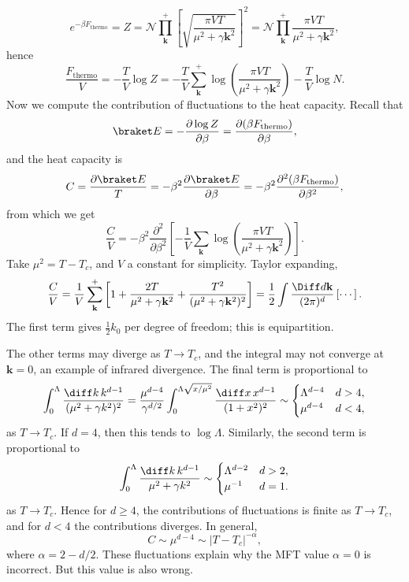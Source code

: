 \documentclass[12pt]{article}
\begin{document}
\[
	e^{-\beta F_{\mathrm{thermo}}} = Z = \mathcal{N}\prod_{\mathbf{k}}^+ \left[ \sqrt{\frac{\pi V T}{\mu^2 + \gamma \mathbf{k}^2}} \right]^2 = \mathcal{N} \prod_{\mathbf{k}}^+ \frac{\pi V T}{\mu^2 + \gamma \mathbf{k}^2},
\]
hence
\[
\frac{F_{\mathrm{thermo}}}{V} = - \frac{T}{V} \log Z = - \frac{T}{V} \sum_{\mathbf{k}}^+ \log \left( \frac{\pi V T}{\mu^2 + \gamma \mathbf{k}^2} \right) - \frac{T}{V} \log N.
\]
Now we compute the contribution of fluctuations to the heat capacity. Recall that
\[
\braket E = - \frac{\partial \log Z}{\partial \beta} = \frac{\partial (\beta F_{\mathrm{thermo}})}{\partial \beta},
\]
and the heat capacity is
\[
C = \frac{\partial \braket E}{T} = - \beta^2 \frac{\partial \braket E}{\partial \beta} = - \beta^2\frac{\partial^2 (\beta F_{\mathrm{thermo}})}{\partial \beta^2},
\]
from which we get
\[
	\frac{C}{V} = - \beta^2 \frac{\partial^2}{\partial \beta^2} \left[ - \frac{1}{V} \sum_{\mathbf{k}} \log \left( \frac{\pi V T}{\mu^2 + \gamma \mathbf{k}^2} \right) \right].
\]
Take $\mu^2 = T - T_c$, and $V$ a constant for simplicity. Taylor expanding,
\[
	\frac{C}{V} = \frac{1}{V} \sum^+_{\mathbf{k}} \left[1 + \frac{2T}{\mu^2 + \gamma \mathbf{k}^2} + \frac{T^2}{(\mu^2 + \gamma \mathbf{k}^2)^2} \right] = \frac{1}{2} \int \frac{\Diff d \mathbf{k}}{(2 \pi)^d} \left[ \cdots \right].
\]
The first term gives $\frac{1}{2} k_0$ per degree of freedom; this is equipartition.

The other terms may diverge as $T \to T_c$, and the integral may not converge at $\mathbf{k} = 0$, an example of infrared divergence. The final term is proportional to
\[
	\int_0^\Lambda \frac{\diff k \, k^{d-1}}{(\mu^2 + \gamma k^2)^2} = \frac{\mu^{d-4}}{\gamma^{d/2}} \int_{0}^{\Lambda \sqrt{x/\mu^2}} \frac{\diff x\, x^{d-1}}{(1 + x^2)^2} \sim
	\begin{cases}
		\Lambda^{d-4} & d > 4, \\
		\mu^{d-4} & d < 4,
	\end{cases}	
\]
as $T \to T_c$. If $d = 4$, then this tends to $\log \Lambda$. Similarly, the second term is proportional to
\[
\int_0^\Lambda \frac{\diff k \, k^{d-1}}{\mu^2 + \gamma k^2} \sim
\begin{cases}
	\Lambda^{d-2} & d > 2, \\
	\mu^{-1} & d = 1.
\end{cases}
\]
as $T \to T_c$. Hence for $d \geq 4$, the contributions of fluctuations is finite as $T \to T_c$, and for $d < 4$ the contributions diverges. In general,
\[
C \sim \mu^{d-4} \sim |T - T_c|^{-\alpha},
\]
where $\alpha = 2 - d/2$. These fluctuations explain why the MFT value $\alpha = 0$ is incorrect. But this value is also wrong.


\newpage

\printindex
\end{document}
